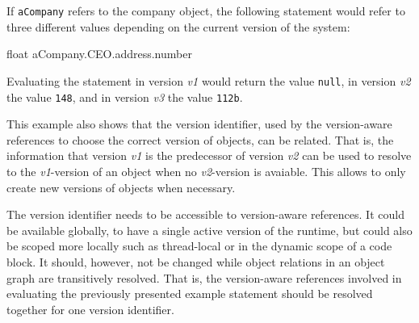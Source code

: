 If \lstinline{aCompany} refers to the company object, the following statement would refer to three different values depending on the current version of the system:

\begin{code}{}{float}
aCompany.CEO.address.number
\end{code}
\iffalse
\end{verbatim}\fi

Evaluating the statement in version \emph{v1} would return the value \lstinline{null}, in version \emph{v2} the value \lstinline{148}, and in version \emph{v3} the value \lstinline{112b}.

This example also shows that the version identifier, used by the version-aware references to choose the correct version of objects, can be related.
That is, the information that version \emph{v1} is the predecessor of version \emph{v2} can be used to resolve to the \emph{v1}-version of an object when no \emph{v2}-version is avaiable.
This allows to only create new versions of objects when necessary.

The version identifier needs to be accessible to version-aware references.
It could be available globally, to have a single active version of the runtime, but could also be scoped more locally such as thread-local or in the dynamic scope of a code block.
It should, however, not be changed while object relations in an object graph are transitively resolved.
That is, the version-aware references involved in evaluating the previously presented example statement should be resolved together for one version identifier.










